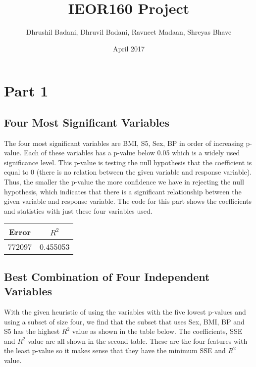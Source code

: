 \documentclass[15pt,a4paper,openright]{article}
\title{IEOR160 Project}
\author{Dhrushil Badani, Dhruvil Badani, Ravneet Madaan, Shreyas Bhave}
\date{April 2017}
\begin{document}
\maketitle

\tableofcontents

\newpage
 
\section{Part 1}

\vspace{4mm}

\subsection{Four Most Significant Variables}

The four most significant variables are BMI, S5, Sex, BP in order of increasing p-value. Each of these variables has a p-value below 0.05 which is a widely used significance level. This p-value is testing the null hypothesis that the coefficient is equal to 0 (there is no relation between the given variable and response variable). Thus, the smaller the p-value the more confidence we have in rejecting the null hypothesis, which indicates that there is a significant relationship between the given variable and response variable. The code for this part shows the coefficients and statistics with just these four variables used.

\begin{center}
 \begin{tabular}{||c | c||} 
 \hline
 Error & $R^2$  \\ [0.5ex] 
 \hline\hline
 772097 & 0.455053   \\ 
 [1ex] 
 \hline
\end{tabular}
\end{center}

\subsection{Best Combination of Four Independent Variables}

With the given heuristic of using the variables with the five lowest p-values and using a subset of size four, we find that the subset that uses Sex, BMI, BP and S5 has the highest $R^2$ value as shown in the table below. The coefficients, SSE and $R^2$ value are all shown in the second table. These are the four features with the least p-value so it makes sense that they have the minimum SSE and $R^2$ value. 
\end{document}

